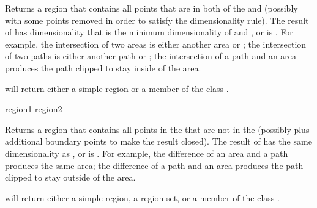 Returns a region that contains all points that are in both of the 
 and  (possibly with some points removed in order to
satisfy the dimensionality rule).  The result of  has
dimensionality that is the minimum dimensionality of  and
, or is .  For example, the intersection of two areas
is either another area or ; the intersection of two paths is
either another path or ; the intersection of a path and an area
produces the path clipped to stay inside of the area.

 will return either a simple region or a member of the
class .

\MayCaptureInputs

 {region1 region2}

Returns a region that contains all points in the  
that are not in the   (possibly plus additional
boundary points to make the result closed).  The result of
 has the same dimensionality as , or is
.  For example, the difference of an area and a path produces the
same area; the difference of a path and an area produces the path clipped to
stay outside of the area.

 will return either a simple region, a region set, or a
member of the class .

\MayCaptureInputs


